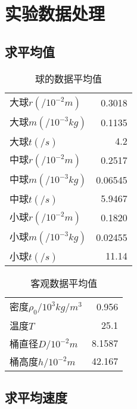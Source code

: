 \documentclass{article}
\begin{document}
\section{实验数据处理}

\subsection{求平均值}

\begin{table}[!hbtp]
    \begin{center}
    \caption{球的数据平均值}
    \begin{tabular}{l|r}

        \hline
        大球$r(/10^{-2}m)$ & 0.3018 \\
        大球$m(/10^{-3}kg)$ & 0.1135 \\
        大球$t(/s)$ & 4.2 \\
        中球$r(/10^{-2}m)$ & 0.2517 \\
        中球$m(/10^{-3}kg)$ & 0.06545 \\
        中球$t(/s)$ & 5.9467 \\
        小球$r(/10^{-2}m)$ & 0.1820 \\
        小球$m(/10^{-3}kg)$ & 0.02455 \\
        小球$t(/s)$ & 11.14 \\

    \end{tabular}
    \end{center}
\end{table}

\begin{table}[!hbtp]
    \begin{center}
    \caption{客观数据平均值}
    \begin{tabular}{l|r}

        \hline
        密度$\rho _0/10^{3}kg/m^3$ &0.956 \\
        温度$T$ & 25.1 \\
        桶直径$D/10^{-2}m$ & 8.1587 \\
        桶高度$h/10^{-2}m$ & 42.167 \\

    \end{tabular}
    \end{center}
\end{table}

\newpage

\subsection{求平均速度}
\end{document}
